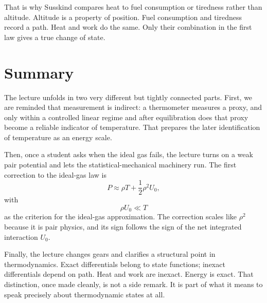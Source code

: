 That is why Susskind compares heat to fuel consumption or tiredness rather than altitude. Altitude is a property of position. Fuel consumption and tiredness record a path. Heat and work do the same. Only their combination in the first law gives a true change of state.

\section{Summary}

The lecture unfolds in two very different but tightly connected parts. First, we are reminded that measurement is indirect: a thermometer measures a proxy, and only within a controlled linear regime and after equilibration does that proxy become a reliable indicator of temperature. That prepares the later identification of temperature as an energy scale.

Then, once a student asks when the ideal gas fails, the lecture turns on a weak pair potential and lets the statistical-mechanical machinery run. The first correction to the ideal-gas law is
\begin{equation}
P\approx \rho T+\frac{1}{2}\rho^2U_0,
\end{equation}
with
\begin{equation}
\rho U_0 \ll T
\end{equation}
as the criterion for the ideal-gas approximation. The correction scales like \(\rho^2\) because it is pair physics, and its sign follows the sign of the net integrated interaction \(U_0\).

Finally, the lecture changes gears and clarifies a structural point in thermodynamics. Exact differentials belong to state functions; inexact differentials depend on path. Heat and work are inexact. Energy is exact. That distinction, once made cleanly, is not a side remark. It is part of what it means to speak precisely about thermodynamic states at all.